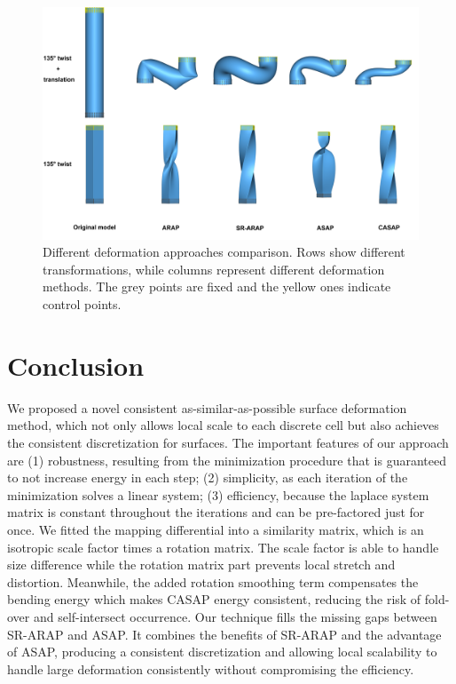  \begin{figure}[!hptb]
 \centering

 \captionsetup[subfigure]{labelformat=empty}
 \centering

			\includegraphics[width=\columnwidth]{./figure/deformation_comparison.png}


     \caption{Different deformation approaches comparison. Rows show different transformations, while columns represent different deformation methods. The grey points are fixed and the yellow ones indicate control points.  }
     \label{fig:deformation_comparison}
 \end{figure}
\section{Conclusion}
We proposed a novel consistent as-similar-as-possible surface deformation method, which not only allows local scale to each discrete cell but also achieves the consistent discretization for surfaces. The important features of our approach are (1) robustness, resulting from the minimization procedure that is guaranteed to not increase energy in each step; (2) simplicity, as each iteration of the minimization solves a linear system; (3) efficiency, because the laplace system matrix is constant throughout the iterations and can be pre-factored just for once. We fitted the mapping differential into a similarity matrix, which is an isotropic scale factor times a rotation matrix. The scale factor is able to handle size difference while the rotation matrix part prevents local stretch and distortion. Meanwhile, the added rotation smoothing term compensates the bending energy which makes CASAP energy consistent, reducing the risk of fold-over and self-intersect occurrence. Our technique fills the missing gaps between SR-ARAP and ASAP. It combines the benefits of SR-ARAP and the advantage of ASAP, producing a consistent discretization and allowing local scalability to handle large deformation consistently without compromising the efficiency.




\ifx\isEmbedded\undefined
\pagebreak

\fi
